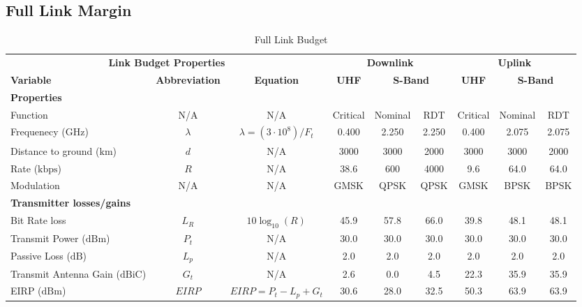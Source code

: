 \documentclass[a4paper, 11pt, conference]{IEEEtran}
\begin{document}
\FloatBarrier

\clearpage
\subsection{Full Link Margin}
\begin{table}[H]
\centering
\caption{Full Link Budget}
\label{tab:fedr_link_budget}

\begin{sideways}
\footnotesize 
\setlength{\tabcolsep}{4pt}

\begin{tabular}{|l|c|c||c|c|c|c|c|c|}
\hline
\multicolumn{3}{|c||}{\textbf{Link Budget Properties}} & \multicolumn{3}{|c|}{\textbf{Downlink}} & \multicolumn{3}{|c|}{\textbf{Uplink}} \\
\cline{1-9}
\textbf{Variable} & \textbf{Abbreviation} & \textbf{Equation} & \textbf{UHF} & \multicolumn{2}{|c|}{\textbf{S-Band}} & \textbf{UHF } & \multicolumn{2}{|c|}{\textbf{S-Band}} \\
\hline
\hline

\multicolumn{9}{|l|}{\textbf{Properties}} \\
\hline
Function & N/A & N/A & Critical & Nominal & RDT & Critical & Nominal & RDT  \\
Frequenecy ($\mathrm{GHz}$)& $\lambda$ & $\lambda = (3\cdot10^8)/F_t$ & 0.400 & 2.250 & 2.250 & 0.400 & 2.075 & 2.075 \\
Distance to ground ($\mathrm{km}$) & $d$ & N/A & 3000 & 3000 & 2000 & 3000 & 3000 & 2000  \\
Rate ($\mathrm{kbps}$) & $R$ & N/A & 38.6 & 600 & 4000 & 9.6 & 64.0 & 64.0  \\
Modulation & N/A & N/A & GMSK & QPSK & QPSK & GMSK & BPSK & BPSK \\
\hline
\hline

\multicolumn{9}{|l|}{\textbf{Transmitter losses/gains}} \\
\hline
Bit Rate loss & $L_R$ & $10\log_{10}(R)$ & 45.9 & 57.8 & 66.0 & 39.8 & 48.1 & 48.1\\
Transmit Power ($\mathrm{dBm}$) & $P_t$ & N/A & 30.0 & 30.0 & 30.0 & 30.0 & 30.0 & 30.0 \\
Passive Loss ($\mathrm{dB}$) & $L_p$ & N/A & 2.0 & 2.0 & 2.0 & 2.0 & 2.0 & 2.0 \\
Transmit Antenna Gain ($\mathrm{dBiC}$) & $G_t$ & N/A & 2.6 & 0.0 & 4.5 & 22.3 & 35.9 & 35.9  \\
EIRP ($\mathrm{dBm}$) & $EIRP$ & $EIRP = P_t-L_p+G_t$ & 30.6 & 28.0 & 32.5 & 50.3 & 63.9 & 63.9  \\
\hline
\hline


\end{tabular}
\end{sideways}
\end{table}
\end{document}

